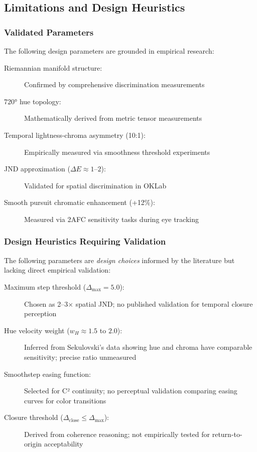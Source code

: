 \subsection{Limitations and Design Heuristics}
\label{sec:limitations-heuristics}

\subsubsection{Validated Parameters}

The following design parameters are grounded in empirical research:

\begin{description}
    \item[Riemannian manifold structure:] Confirmed by comprehensive discrimination measurements \citep{hong2024}
    \item[720° hue topology:] Mathematically derived from metric tensor measurements \citep{nolle2012}
    \item[Temporal lightness-chroma asymmetry (10:1):] Empirically measured via smoothness threshold experiments \citep{sekulovski2007}
    \item[JND approximation ($\Delta E \approx 1$–$2$):] Validated for spatial discrimination in OKLab \citep{hong2024,ottosson2020}
    \item[Smooth pursuit chromatic enhancement (+12\%):] Measured via 2AFC sensitivity tasks during eye tracking \citep{braun2017}
\end{description}

\subsubsection{Design Heuristics Requiring Validation}

The following parameters are \emph{design choices} informed by the literature but lacking direct empirical validation:

\begin{description}
    \item[Maximum step threshold ($\Delta_{\max} = 5.0$):] Chosen as 2–3× spatial JND; no published validation for temporal closure perception
    \item[Hue velocity weight ($w_H \approx 1.5$ to $2.0$):] Inferred from Sekulovski's data showing hue and chroma have comparable sensitivity; precise ratio unmeasured
    \item[Smoothstep easing function:] Selected for C² continuity; no perceptual validation comparing easing curves for color transitions
    \item[Closure threshold ($\Delta_{\text{close}} \leq \Delta_{\max}$):] Derived from coherence reasoning; not empirically tested for return-to-origin acceptability
\end{description}

